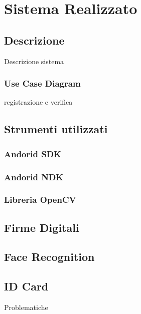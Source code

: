 \section{Sistema Realizzato}
\subsection{Descrizione} 
Descrizione sistema
\subsubsection{Use Case Diagram}
registrazione e verifica
\subsection{Strumenti utilizzati}
\subsubsection{Andorid SDK}
\subsubsection{Andorid NDK}
\subsubsection{Libreria OpenCV}

\subsection{Firme Digitali}

\subsection{Face Recognition}

\subsection{ID Card}
Problematiche


